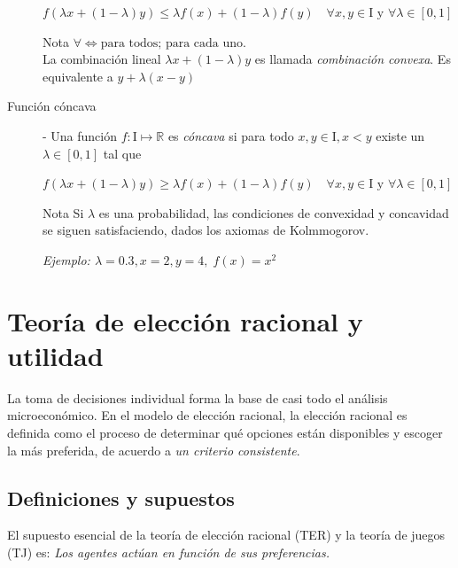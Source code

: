 \documentclass[12pt]{scrartcl}
\theoremstyle{definition}
\begin{document}
\begin{description}
	\begin{center}
	    $f(\lambda x + (1 - \lambda)y) \leq \lambda f(x) + (1-\lambda)f(y)\quad \forall x,y\in \mathrm{I}  \text{ y } \forall \lambda \in [0, 1]$
	\end{center}
	\begin{summarybox}[colback=red!15]{Nota}
		$\forall \Longleftrightarrow \text{para todos; para cada uno}$. \\
		La combinación lineal $\lambda x + (1 - \lambda)y$ es llamada \textit{combinación convexa}. Es equivalente a $y + \lambda(x-y)$
	\end{summarybox}

	
	\item[Función cóncava] - Una función $f\colon \mathrm{I} \mapsto \mathbb{R}$ es \textit{cóncava} si para todo $x, y \in \mathrm{I}, x < y$ existe un $\lambda \in [0, 1]$ tal que 
	
	\begin{center}
	    $f(\lambda x + (1 - \lambda)y) \geq \lambda f(x) + (1-\lambda)f(y)\quad \forall x,y\in \mathrm{I} \text{ y } \forall \lambda \in [0, 1]$
	\end{center}
	
	\begin{summarybox}[colback=red!15]{Nota}
    	Si $\lambda$ es una probabilidad, las condiciones de convexidad y concavidad se siguen satisfaciendo, dados los axiomas de Kolmmogorov.
	\end{summarybox}
	
	\textit{Ejemplo: $\lambda = 0.3, x = 2, y = 4,\; f(x) = x^2$}

\end{description}

\section{Teoría de elección racional y utilidad}

La toma de decisiones individual forma la base de casi todo el análisis microeconómico. En el modelo de elección racional, la elección racional es definida como el proceso de determinar qué opciones están disponibles y escoger la más preferida, de acuerdo a \textit{un criterio consistente}. 

\subsection{Definiciones y supuestos}

El supuesto esencial de la teoría de elección racional (TER) y la teoría de juegos (TJ) es: \textit{Los agentes actúan en función de sus preferencias.} 
\end{document}
